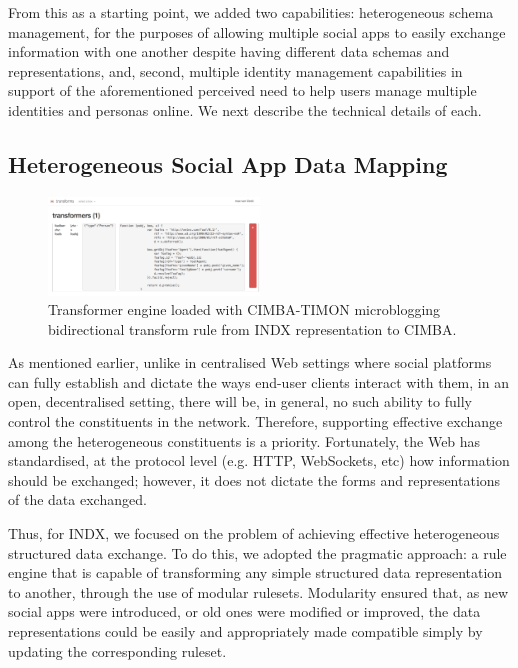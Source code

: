 \documentclass{sig-alternate}
\begin{document}
From this as a starting point, we added two capabilities: heterogeneous schema management, for the purposes
of allowing multiple social apps to easily exchange information with one another despite having different
data schemas and representations, and, second, multiple identity management capabilities in support of
the aforementioned perceived need to help users manage multiple identities and personas online. 
We next describe the technical details of each.

\subsection{Heterogeneous Social App Data Mapping}

\begin{figure}[t!]
 	  \begin{center}
        \includegraphics[width=0.50\textwidth]{transformer}
       \end{center}
    \caption{%
        Transformer engine loaded with CIMBA-TIMON microblogging bidirectional transform rule from INDX representation to CIMBA.
    }%
  \label{fig:transform}
\end{figure}


As mentioned earlier, unlike in centralised Web settings where social platforms can fully establish and dictate the ways end-user clients interact with them, in an open, decentralised setting, there will be, in general, no such ability to fully control the constituents in the network.  Therefore, supporting effective exchange among the heterogeneous constituents is a priority.  Fortunately, the Web has standardised, at the protocol level (e.g. HTTP, WebSockets, etc) how information should be exchanged; however, it does not dictate the forms and representations of the data exchanged. 

Thus, for INDX, we focused on the problem of achieving effective heterogeneous structured data exchange.  To do this, we adopted the pragmatic approach: a rule engine that is capable of transforming any simple structured data representation to another, through the use of modular rulesets.  Modularity ensured that, as new social apps were introduced, or old ones were modified or improved, the data representations could be easily and appropriately made compatible simply by updating the corresponding ruleset. 
\end{document}
